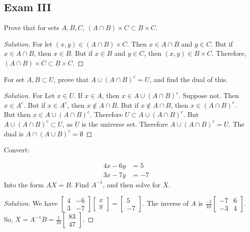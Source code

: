 \documentclass[../main.tex]{subfiles}
\begin{document}
\subsection{Exam III}
%
\begin{problem}
Prove that for sets $A,B,C$, $(A\cap B)\times C \subset B\times C$.
\end{problem}
\begin{proof}[Solution]
For let $(x,y) \in (A\cap B)\times C$. Then $x\in A\cap B$ and $y\in C$. But if $x\in A\cap B$, then $x\in B$. But if $x\in B$ and $y\in C$, then $(x,y) \in B\times C$. Therefore, $(A\cap B)\times C \subset B\times C$. 
\end{proof}

\begin{problem}
For set $A,B\subset U$, prove that $A\cup (A\cap B)^c = U$, and find the dual of this.
\end{problem}
\begin{proof}[Solution]
For Let $x\in U$. If $x\in A$, then $x\in A\cup (A\cap B)^c$. Suppose not. Then $x\in A^c$. But if $x\in A^c$, then $x\notin A\cap B$. But if $x\notin A\cap B$, then $x\in (A\cap B)^c$. But then $x\in A\cup (A\cap B)^c$. Therefore $U\subset A\cup (A\cap B)^c$. But $A\cup (A\cap B)^c \subset U$, as $U$ is the universe set. Therefore $A\cup (A\cap B)^c = U$. The dual is $A\cap (A\cup B)^c = \emptyset$
\end{proof}

\begin{problem}
Convert:

\begin{align}
\nonumber 4x-6y &= 5 \\
\nonumber 3x-7y &= -7
\end{align}
Into the form $AX = B$. Find $A^{-1}$, and then solve for $X$.
\end{problem}
\begin{proof}[Solution]
We have $\begin{bmatrix} 4 & -6 \\ 3 & -7 \end{bmatrix} \begin{bmatrix} x \\ y \end{bmatrix} = \begin{bmatrix} 5 \\ -7 \end{bmatrix}$. The inverse of $A$ is $\frac{-1}{10}\begin{bmatrix} -7 & 6 \\ -3 & 4\end{bmatrix}$. So, $X = A^{-1}B = \frac{1}{10} \begin{bmatrix}83 \\ 47 \end{bmatrix}$.
\end{proof}
\end{document}
